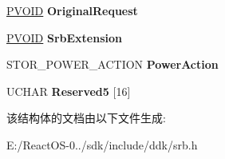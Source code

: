 \begin{DoxyCompactItemize}
\item 
\mbox{\label{struct___s_c_s_i___p_o_w_e_r___r_e_q_u_e_s_t___b_l_o_c_k_aae071afda28ff2eac69077083b0bf543}} 
\hyperlink{interfacevoid}{P\+V\+O\+ID} {\bfseries Original\+Request}
\item 
\mbox{\label{struct___s_c_s_i___p_o_w_e_r___r_e_q_u_e_s_t___b_l_o_c_k_aa74190bbf7d25843978f82d0dab2cee9}} 
\hyperlink{interfacevoid}{P\+V\+O\+ID} {\bfseries Srb\+Extension}
\item 
\mbox{\label{struct___s_c_s_i___p_o_w_e_r___r_e_q_u_e_s_t___b_l_o_c_k_a404aaf573c7d9ca31e7f4d1f1a147229}} 
S\+T\+O\+R\+\_\+\+P\+O\+W\+E\+R\+\_\+\+A\+C\+T\+I\+ON {\bfseries Power\+Action}
\item 
\mbox{\label{struct___s_c_s_i___p_o_w_e_r___r_e_q_u_e_s_t___b_l_o_c_k_aaf02ca71a5cd9eb167bda50e40a9bbca}} 
U\+C\+H\+AR {\bfseries Reserved5} \mbox{[}16\mbox{]}
\end{DoxyCompactItemize}


该结构体的文档由以下文件生成\+:\begin{DoxyCompactItemize}
\item 
E\+:/\+React\+O\+S-\/0../sdk/include/ddk/srb.\+h\end{DoxyCompactItemize}
